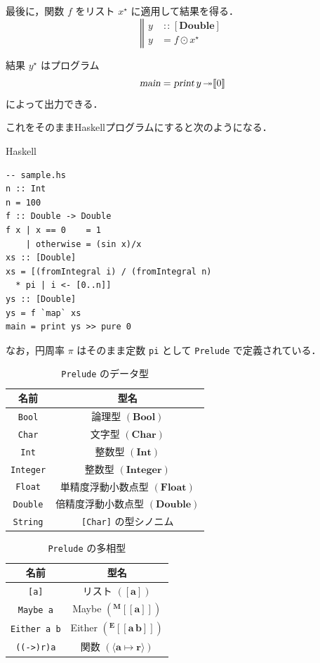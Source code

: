 \documentclass[a5paper,twoside,fleqn,draft]{jsbook}
\def\[{[\![}
\def\]{]\!]}
\newcommand{\programminglanguage}[1]{\textsf{#1}}
\newcommand{\haskell}{\programminglanguage{Haskell}}
\newcommand{\code}[1]{\texttt{#1}}
\newcommand{\filename}[1]{\texttt{#1}}
\newenvironment{haskellcode}{\begin{itembox}[r]{\haskell}}{\end{itembox}}
\newcommand{\mBrace}{\Vert}
\newcommand{\mAction}[1]{\textsl{#1}}
\DeclareMathOperator{\mMain}{\mAction{main}}
\DeclareMathOperator{\mPrint}{\mAction{print}}
\DeclareMathOperator{\mBindRightIgnore}{\twoheadrightarrow}
\DeclareMathOperator{\mFuncArrow}{\mapsto}
\DeclareMathOperator{\mIn}{{:\!:}}
\DeclareMathOperator{\mMapList}{\odot}
\newcommand{\mType}[1]{\mathbf{#1}} %
\newcommand{\mA}{\mType{a}}
\newcommand{\mBoolType}{\mType{Bool}}
\newcommand{\mCharType}{\mType{Char}}
\newcommand{\mFloatType}{\mType{Float}}
\newcommand{\mDoubleType}{\mType{Double}}
\newcommand{\mIntType}{\mType{Int}}
\newcommand{\mIntegerType}{\mType{Integer}}
\newcommand{\mFuncType}[2]{\langle\mType{#1}\mFuncArrow\mType{#2}\rangle}
\newcommand{\mTypeAssemble}[2]{{}^\mType{#1}\[\mType{#2}\]}
\newcommand{\mTypeAssembleII}[3]{{}^\mType{#1}\[\mType{#2}\,\mType{#3}\]}
\newcommand{\mEitherType}[2]{\mTypeAssembleII{E}{#1}{#2}}
\newcommand{\mMaybeType}[1]{\mTypeAssemble{M}{#1}}
\newcommand{\mPureWith}[1]{\[#1\]}
\newcommand{\mList}[1]{{#1}^\mathrm{\star}}
\begin{document}
最後に，関数 $f$ をリスト $\mList{x}$ に適用して結果を得る．
\begin{equation}
  \left\mBrace
  \begin{aligned}
    y
    &\mIn{}[\mDoubleType]\\
    y
    &=f\mMapList\mList{x}
  \end{aligned}
  \right.
\end{equation}

結果 $\mList{y}$ はプログラム
\begin{equation}
\mMain=\mPrint y\mBindRightIgnore\mPureWith{0}
\end{equation}
によって出力できる．

これをそのまま\haskell プログラムにすると次のようになる．
\begin{haskellcode}
\begin{verbatim}
-- sample.hs
n :: Int
n = 100
f :: Double -> Double
f x | x == 0    = 1
    | otherwise = (sin x)/x
xs :: [Double]
xs = [(fromIntegral i) / (fromIntegral n)
  * pi | i <- [0..n]]
ys :: [Double]
ys = f `map` xs
main = print ys >> pure 0
\end{verbatim}
\end{haskellcode}

なお，円周率 $\pi$ はそのまま定数 \code{pi} として \filename{Prelude}
で定義されている．

\begin{table}
\caption{\filename{Prelude} のデータ型}
\label{tab:data-types}
\begin{center}
\begin{tabular}{||c|c||}
\hline
名前&型名\\
\hline\hline
\code{Bool}&論理型 $(\mBoolType)$\\
\code{Char}&文字型 $(\mCharType)$\\
\code{Int}&整数型 $(\mIntType)$\\
\code{Integer}&整数型 $(\mIntegerType)$\\
\code{Float}&単精度浮動小数点型 $(\mFloatType)$\\
\code{Double}&倍精度浮動小数点型 $(\mDoubleType)$\\
\code{String}&\code{[Char]} の型シノニム\\
\hline
\end{tabular}
\end{center}
\end{table}

\begin{table}
\caption{\filename{Prelude} の多相型}
\label{tab:data-types-polymorphic}
\begin{center}
\begin{tabular}{||c|c||}
\hline
名前&型名\\
\hline\hline
\code{[a]}&リスト $([\mA])$\\
\code{Maybe a}&Maybe $\left(\mMaybeType{a}\right)$\\
\code{Either a b}&Either $\left(\mEitherType{a}{b}\right)$\\
\code{((->)r)a}&関数 $\left(\mFuncType{a}{r}\right)$\\
\hline
\end{tabular}
\end{center}
\end{table}
\end{document}
